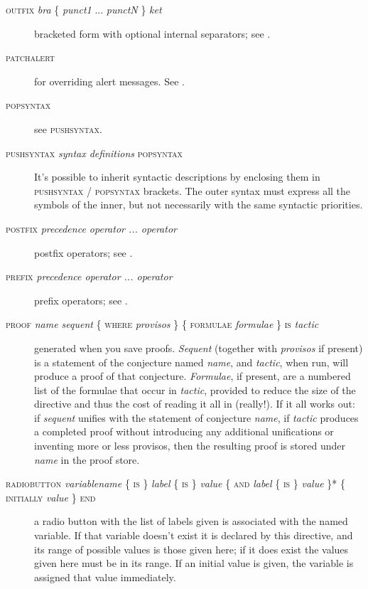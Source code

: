\begin{description}
\item[\textsc{outfix} \textit{bra} \{ \textit{punct1} ... \textit{punctN} \} \textit{ket}] bracketed form with optional internal separators; see .

\item[\textsc{patchalert}] for overriding alert messages. See .

\item[\textsc{popsyntax}] see \textsc{pushsyntax}.

\item[\textsc{pushsyntax} \textit{syntax definitions} \textsc{popsyntax}] It's possible to inherit  syntactic descriptions by enclosing them in \textsc{pushsyntax} / \textsc{popsyntax} brackets. The outer syntax must express all the symbols of the inner, but not necessarily with the same syntactic priorities.

\item[\textsc{postfix} \textit{precedence operator ... operator}] postfix operators; see .

\item[\textsc{prefix} \textit{precedence operator ... operator}] prefix operators; see .

\item[\textsc{proof} \textit{name sequent} \{ \textsc{where} \textit{provisos} \} \{ \textsc{formulae} \textit{formulae} \} \textsc{is} \textit{tactic}] generated when you save proofs. \textit{Sequent} (together with \textit{provisos} if present) is a statement of the conjecture named \textit{name}, and \textit{tactic}, when run, will produce a proof of that conjecture. \textit{Formulae}, if present, are a numbered list of the formulae that occur in \textit{tactic}, provided to reduce the size of the directive and thus the cost of reading it all in (really!). If it all works out: if \textit{sequent} unifies with the statement of conjecture \textit{name}, if \textit{tactic} produces a completed proof without introducing any additional unifications or inventing more or less provisos, then the resulting proof is stored under \textit{name} in the proof store.

\item[\textsc{radiobutton} \textit{variablename} \{ \textsc{is} \} \textit{label} \{ \textsc{is} \} \textit{value} \{ \textsc{and} \textit{label} \{ \textsc{is} \} \textit{value} \}* \{ \textsc{initially} \textit{value} \} \textsc{end}] a radio button with the list of labels given is associated with the named variable. If that variable doesn't exist it is declared by this directive, and its range of possible values is those given here; if it does exist the values given here must be in its range. If an initial value is given, the variable is assigned that value immediately.


\end{description}
